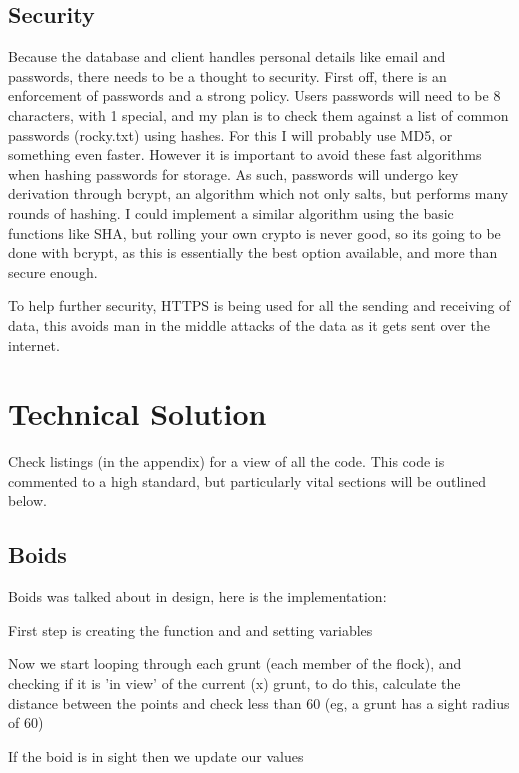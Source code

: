 \documentclass[a4paper, 11pt]{report}
\begin{document}
\section{Security}
Because the database and client handles personal details like email and passwords, there needs to be a thought to security. First off, there is an enforcement of passwords and a strong policy. Users passwords will need to be 8 characters, with 1 special, and my plan is to check them against a list of common passwords (rocky.txt) using hashes. For this I will probably use MD5, or something even faster. However it is important to avoid these fast algorithms when hashing passwords for storage. As such, passwords will undergo key derivation through bcrypt, an algorithm which not only salts, but performs many rounds of hashing. I could implement a similar algorithm using the basic functions like SHA, but rolling your own crypto is never good, so its going to be done with bcrypt, as this is essentially the best option available, and more than secure enough.

To help further security, HTTPS is being used for all the sending and receiving of data, this avoids man in the middle attacks of the data as it gets sent over the internet. 


\chapter{Technical Solution}
Check listings (in the appendix) for a view of all the code. This code is commented to a high standard, but particularly vital sections will be outlined below.

\section{Boids}
Boids was talked about in design, here is the implementation:

First step is creating the function and and setting variables


Now we start looping through each grunt (each member of the flock), and checking if it is 'in view' of the current (x) grunt, to do this, calculate the distance between the points and check less than 60 (eg, a grunt has a sight radius of 60) 


If the boid is in sight then we update our values

\end{document}
